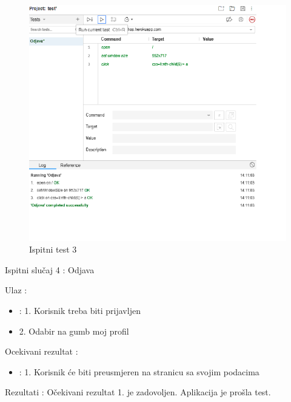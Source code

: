 			\begin{figure}[H]
				\includegraphics[width=1\linewidth]{slike/ispitni_test_3.png} %
				\caption{Ispitni test 3}
				\label{fig:Test3} %
			\end{figure}	

			\noindent Ispitni slučaj 4 : Odjava

			\noindent Ulaz : 
	
			\begin{itemize}
				\item : 1. Korisnik treba biti prijavljen
				\item   2. Odabir na gumb moj profil
			\end{itemize}

			\noindent Ocekivani rezultat : 

			\begin{itemize}
				\item : 1. Korisnik će biti preusmjeren na stranicu sa svojim podacima
			\end{itemize}
	
			\noindent Rezultati : Očekivani rezultat 1. je zadovoljen. Aplikacija je prošla test. 

